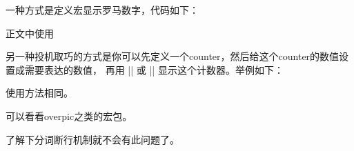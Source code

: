 










一种方式是定义宏显示罗马数字，代码如下：
\begin{texlist}
  \newcommand{\Myroman}[1]{\romannumeral #1}
  \newcommand{\MyRoman}[1]{\expandafter\@slowromancap\romannumeral #1@}
\end{texlist}
正文中使用
\begin{texlist}
   
\end{texlist}

另一种投机取巧的方式是你可以先定义一个counter，然后给这个counter的数值设置成需要表达的数值，
再用 |\Roman| 或 |\roman| 显示这个计数器。举例如下：
\begin{texlist}
  \newcommand{\MyRoman}[1]{\setcounter{romannum}{#1}\Roman{romannum}}
  \newcommand{\Myroman}[1]{\setcounter{romannum}{#1}\roman{romannum}}
\end{texlist}
使用方法相同。



\begin{texlist}
\end{texlist}



可以看看overpic之类的宏包。



了解下分词断行机制就不会有此问题了。








